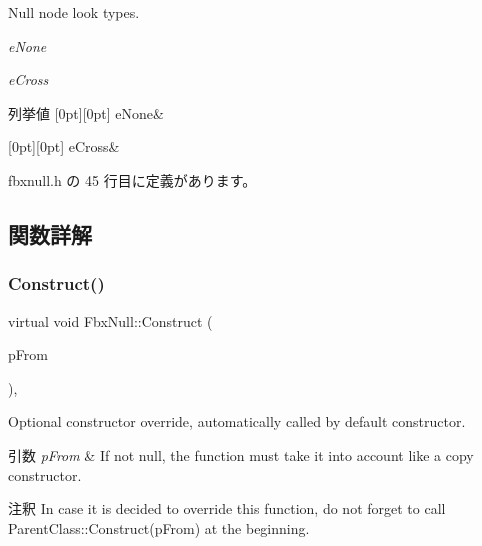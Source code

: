 Null node look types.
\begin{DoxyItemize}
\item {\itshape e\+None} 
\item {\itshape e\+Cross} 
\end{DoxyItemize}\begin{DoxyEnumFields}{列挙値}
[0pt][0pt]{}\mbox{\label{class_fbx_null_aa68cd0be1fca86a79ab603ee99505d78ad2af5d3ef7bcedf7eea5eea2aa0c0330}} 
e\+None&\\
\hline

[0pt][0pt]{}\mbox{\label{class_fbx_null_aa68cd0be1fca86a79ab603ee99505d78aa5ca9ae8a4d16c590308517c74e8ec78}} 
e\+Cross&\\
\hline

\end{DoxyEnumFields}


 fbxnull.\+h の 45 行目に定義があります。



\subsection{関数詳解}
\mbox{\label{class_fbx_null_afb0901136678ef0bbea8cbc9227e9ffd}} 
\subsubsection{\texorpdfstring{Construct()}{Construct()}}
{\footnotesize\ttfamily virtual void Fbx\+Null\+::\+Construct (\begin{DoxyParamCaption}\item[{const \hyperlink{class_fbx_object}{Fbx\+Object} $\ast$}]{p\+From }\end{DoxyParamCaption})\hspace{0.3cm}{\ttfamily [protected]}, {\ttfamily [virtual]}}

Optional constructor override, automatically called by default constructor. 
\begin{DoxyParams}{引数}
{\em p\+From} & If not null, the function must take it into account like a copy constructor. \\
\hline
\end{DoxyParams}
\begin{DoxyRemark}{注釈}
In case it is decided to override this function, do not forget to call Parent\+Class\+::\+Construct(p\+From) at the beginning. 
\end{DoxyRemark}


